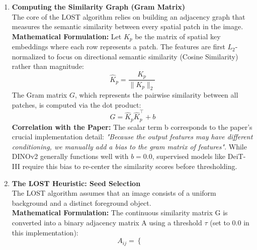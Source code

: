 \documentclass[12pt]{article}
\begin{document}
\begin{enumerate}
        \textbf{Token Slicing:}
        Before passing the features to the LOST algorithm, the non-spatial special tokens must be discarded.
        \begin{itemize}
            \item Baseline DINOv2: The sequence length contains 1 \texttt{[CLS]} token followed by the image patches. The first token is sliced off: \texttt{keys\_no\_reg[1:, :]}.
            \item DINOv2 with Registers: The sequence contains 1 \texttt{[CLS]} token and 4 \texttt{[REG]} tokens. The first 5 tokens must be discarded so the algorithm only computes the similarity of the physical image patches: \texttt{keys\_reg\_4[5:, :]}.
        \end{itemize}
    \item \textbf{Computing the Similarity Graph (Gram Matrix)}\\
        The core of the LOST algorithm relies on building an adjacency graph that measures the semantic similarity between every spatial patch in the image.\\
        \textbf{Mathematical Formulation:}
        Let $K_p$ be the matrix of spatial key embeddings where each row represents a patch. The features are first $L_2$-normalized to focus on directional semantic similarity (Cosine Similarity) rather than magnitude:
        \[
            \hat{K}_p = \frac{K_p}{\|K_p\|_2}
        \]
        The Gram matrix $G$, which represents the pairwise similarity between all patches, is computed via the dot product:
        \[
            G = \hat{K}_p \hat{K}_p^\top + b
        \]
        \textbf{Correlation with the Paper:}
        The scalar term b corresponds to the paper's crucial implementation detail: \textit{"Because the output features may have different conditioning, we manually add a bias to the gram matrix of features"}. While DINOv2 generally functions well with $b=0.0$, supervised models like DeiT-III require this bias to re-center the similarity scores before thresholding.
    \item \textbf{The LOST Heuristic: Seed Selection}\\
        The LOST algorithm assumes that an image consists of a uniform background and a distinct foreground object.\\
        \textbf{Mathematical Formulation:}
        The continuous similarity matrix G is converted into a binary adjacency matrix A using a threshold $\tau$ (set to 0.0 in this implementation):
        \[
        A_{ij} = \begin{cases}

\end{cases}\]
\end{enumerate}
\end{document}

